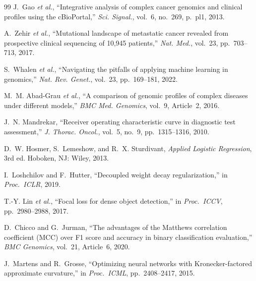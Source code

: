 \documentclass[journal]{IEEEtran}
\begin{document}
\begin{thebibliography}{99}
J.~Gao \textit{et al.},
``Integrative analysis of complex cancer genomics and clinical
profiles using the cBioPortal,''
\textit{Sci. Signal.}, vol.~6, no.~269, p.~pl1, 2013.

A.~Zehir \textit{et al.},
``Mutational landscape of metastatic cancer revealed from
prospective clinical sequencing of 10,945 patients,''
\textit{Nat. Med.}, vol.~23, pp.~703--713, 2017.

S.~Whalen \textit{et al.},
``Navigating the pitfalls of applying machine learning in
genomics,''
\textit{Nat. Rev. Genet.}, vol.~23, pp.~169--181, 2022.

M.~M. Abad-Grau \textit{et al.},
``A comparison of genomic profiles of complex diseases under
different models,''
\textit{BMC Med. Genomics}, vol.~9, Article~2, 2016.

J.~N. Mandrekar,
``Receiver operating characteristic curve in diagnostic test
assessment,''
\textit{J. Thorac. Oncol.}, vol.~5, no.~9, pp.~1315--1316,
2010.

D.~W. Hosmer, S.~Lemeshow, and R.~X. Sturdivant,
\textit{Applied Logistic Regression}, 3rd ed.
Hoboken, NJ: Wiley, 2013.

I.~Loshchilov and F.~Hutter,
``Decoupled weight decay regularization,''
in \textit{Proc.\ ICLR}, 2019.

T.-Y. Lin \textit{et al.},
``Focal loss for dense object detection,''
in \textit{Proc.\ ICCV}, pp.~2980--2988, 2017.

D.~Chicco and G.~Jurman,
``The advantages of the Matthews correlation coefficient (MCC)
over F1 score and accuracy in binary classification evaluation,''
\textit{BMC Genomics}, vol.~21, Article~6, 2020.

J.~Martens and R.~Grosse,
``Optimizing neural networks with Kronecker-factored
approximate curvature,''
in \textit{Proc.\ ICML}, pp.~2408--2417, 2015.

\end{thebibliography}

\balance
\end{document}
